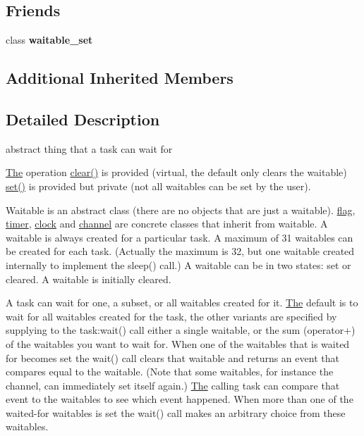 \subsection*{Friends}
\begin{DoxyCompactItemize}
\item 
class {\bfseries waitable\+\_\+set}\hypertarget{class_r_t_o_s_1_1waitable_a0ee29d8961a0b67cea2c3fa76da116da}{}\label{class_r_t_o_s_1_1waitable_a0ee29d8961a0b67cea2c3fa76da116da}

\end{DoxyCompactItemize}
\subsection*{Additional Inherited Members}


\subsection{Detailed Description}
abstract thing that a task can wait for 

\hyperlink{class_the}{The} operation \hyperlink{class_r_t_o_s_1_1waitable_a44ac71980592721bc03e076acc7e8c67}{clear()} is provided (virtual, the default only clears the waitable) \hyperlink{class_r_t_o_s_1_1waitable_a3a72bdf94092471e82ba2d04cdc4a58e}{set()} is provided but private (not all waitables can be set by the user).

Waitable is an abstract class (there are no objects that are just a waitable). \hyperlink{class_r_t_o_s_1_1flag}{flag}, \hyperlink{class_r_t_o_s_1_1timer}{timer}, \hyperlink{class_r_t_o_s_1_1clock}{clock} and \hyperlink{class_r_t_o_s_1_1channel}{channel} are concrete classes that inherit from waitable. A waitable is always created for a particular task. A maximum of 31 waitables can be created for each task. (Actually the maximum is 32, but one waitable created internally to implement the sleep() call.) A waitable can be in two states\+: set or cleared. A waitable is initially cleared.

A task can wait for one, a subset, or all waitables created for it. \hyperlink{class_the}{The} default is to wait for all waitables created for the task, the other variants are specified by supplying to the task\+:wait() call either a single waitable, or the sum (operator+) of the waitables you want to wait for. When one of the waitables that is waited for becomes set the wait() call clears that waitable and returns an event that compares equal to the waitable. (Note that some waitables, for instance the channel, can immediately set itself again.) \hyperlink{class_the}{The} calling task can compare that event to the waitables to see which event happened. When more than one of the waited-\/for waitables is set the wait() call makes an arbitrary choice from these waitables. 

